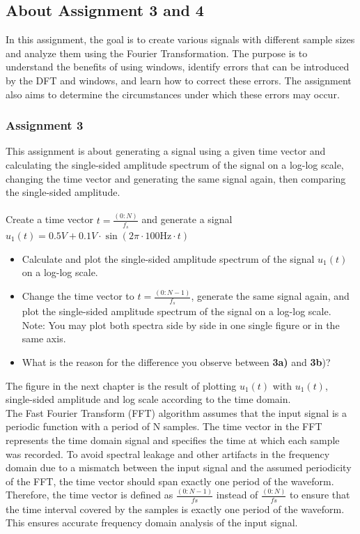 \documentclass[
	a4paper,
	11pt,
]{article}
\begin{document}
\subsection{About Assignment 3 and 4}
In this assignment, the goal is to create various signals with different sample sizes and analyze them using the Fourier Transformation. The purpose is to understand the benefits of using windows, identify errors that can be introduced by the DFT and windows, and learn how to correct these errors. The assignment also aims to determine the circumstances under which these errors may occur.
\\

\subsubsection{Assignment 3}
This assignment is about generating a signal using a given time vector and calculating the single-sided amplitude spectrum of the signal on a log-log scale, changing the time vector and generating the same signal again, then comparing the single-sided amplitude.\\
\\
Create a time vector \(t=\frac{(0:N)}{f_s}\) and generate a signal \(u_1(t) = 0.5V + 0.1V\cdot\sin(2\pi\cdot100\text{Hz}\cdot t)\)\\

\begin{itemize}
\item Calculate and plot the single-sided amplitude spectrum of the signal \(u_1(t)\) on a log-log scale.
\item Change the time vector to \(t = \frac{(0:N-1)}{f_s}\), generate the same signal again, and plot the single-sided amplitude spectrum of the signal on a log-log scale. Note: You may plot both spectra side by side in one single figure or in the same axis.
\item What is the reason for the difference you observe between \textbf{3a)} and \textbf{3b})?
\end{itemize}

The figure in the next chapter is the result of plotting \(u_1(t)\) with \(u_1(t)\), single-sided amplitude and log scale according to the time domain.\\

The Fast Fourier Transform (FFT) algorithm assumes that the input signal is a periodic function with a period of N samples. The time vector in the FFT represents the time domain signal and specifies the time at which each sample was recorded. To avoid spectral leakage and other artifacts in the frequency domain due to a mismatch between the input signal and the assumed periodicity of the FFT, the time vector should span exactly one period of the waveform. Therefore, the time vector is defined as \(\frac{(0:N-1)}{fs}\) instead of \(\frac{(0:N)}{fs}\) to ensure that the time interval covered by the samples is exactly one period of the waveform. This ensures accurate frequency domain analysis of the input signal.
\end{document}
